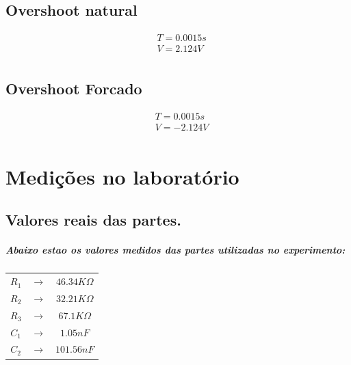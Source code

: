 \documentclass[12pt,twoside, a4paper, twocolumn]{article}
\begin{document}
\subsection{Overshoot natural}

\begin{equation*}
    \begin{align*}
         & T = 0.0015s \\
         & V = 2.124V  \\
    \end{align*}
\end{equation*}

\subsection{Overshoot Forcado}

\begin{equation*}
    \begin{align*}
         & T = 0.0015s \\
         & V = -2.124V \\
    \end{align*}
\end{equation*}

\newpage

\clearpage

\section{Medições no laboratório}

\subsection{Valores reais das partes.}
\subparagraph*{Abaixo estao os valores medidos das partes utilizadas no experimento:}

\begin{center}
    \begin{tabular}{ |ccc| }
        \hline
        $R_1$ & $\rightarrow$ & $46.34K\varOmega$ \\
        $R_2$ & $\rightarrow$ & $32.21K\varOmega$ \\
        $R_3$ & $\rightarrow$ & $67.1K\varOmega$  \\
        $C_1$ & $\rightarrow$ & $1.05nF$          \\
        $C_2$ & $\rightarrow$ & $101.56nF$        \\

        \hline
    \end{tabular}
\end{center}
\end{document}
